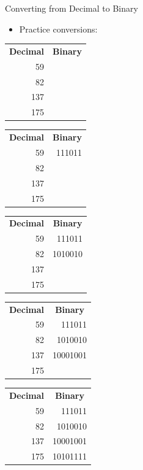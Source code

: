 \documentclass[graphics]{beamer}
\newcommand*{\thead}[1]{\multicolumn{1}{c}{\bfseries #1}}
\begin{document}
\begin{frame}{Converting from Decimal to Binary}
    \begin{itemize}
        \item Practice conversions:
    \end{itemize}
    \centering
     {
        \begin{tabular}{r r}
            \thead{Decimal} & \thead{Binary} \\
             59  & \\
             82  & \\
             137 & \\
             175 &
        \end{tabular}
    }
     {
        \begin{tabular}{r r}
            \thead{Decimal} & \thead{Binary} \\
             59  & 111011 \\
             82  & \\
             137 & \\
             175 &
        \end{tabular}
    }
     {
        \begin{tabular}{r r}
            \thead{Decimal} & \thead{Binary} \\
             59  & 111011 \\
             82  & 1010010 \\
             137 & \\
             175 &
        \end{tabular}
    }
     {
        \begin{tabular}{r r}
            \thead{Decimal} & \thead{Binary} \\
             59  & 111011 \\
             82  & 1010010 \\
             137 & 10001001 \\
             175 &
        \end{tabular}
    }
     {
        \begin{tabular}{r r}
            \thead{Decimal} & \thead{Binary} \\
             59  & 111011 \\
             82  & 1010010 \\
             137 & 10001001 \\
             175 & 10101111
        \end{tabular}
    }
\end{frame}
\end{document}
